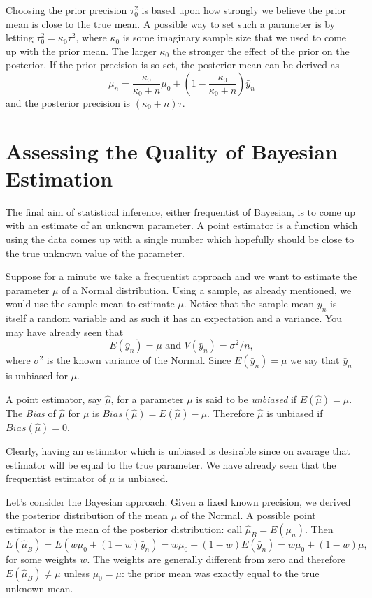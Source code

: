 \documentclass[
]{book}
\begin{document}
Choosing the prior precision \(\tau_0^2\) is based upon how strongly we believe the prior mean is close to the true mean. A possible way to set such a parameter is by letting \(\tau_0^2 = \kappa_0 \tau^2\), where \(\kappa_0\) is some imaginary sample size that we used to come up with the prior mean. The larger \(\kappa_0\) the stronger the effect of the prior on the posterior. If the prior precision is so set, the posterior mean can be derived as
\[
\mu_n= \frac{\kappa_0}{\kappa_0+n}\mu_0+ \left(1-\frac{\kappa_0}{\kappa_0+n}\right)\bar{y}_n
\]
and the posterior precision is \((\kappa_0+n)\tau\).

\hypertarget{assessing-the-quality-of-bayesian-estimation}{%
\section{Assessing the Quality of Bayesian Estimation}\label{assessing-the-quality-of-bayesian-estimation}}

The final aim of statistical inference, either frequentist of Bayesian, is to come up with an estimate of an unknown parameter. A point estimator is a function which using the data comes up with a single number which hopefully should be close to the true unknown value of the parameter.

Suppose for a minute we take a frequentist approach and we want to estimate the parameter \(\mu\) of a Normal distribution. Using a sample, as already mentioned, we would use the sample mean to estimate \(\mu\). Notice that the sample mean \(\bar{y}_n\) is itself a random variable and as such it has an expectation and a variance. You may have already seen that
\[
E(\bar{y}_n)= \mu \mbox{ and } V(\bar{y}_n)= \sigma^2/n,
\]
where \(\sigma^2\) is the known variance of the Normal. Since \(E(\bar{y}_n)=\mu\) we say that \(\bar{y}_n\) is unbiased for \(\mu\).

A point estimator, say \(\hat\mu\), for a parameter \(\mu\) is said to be \emph{unbiased} if \(E(\hat\mu)=\mu\). The \emph{Bias} of \(\hat\mu\) for \(\mu\) is \(Bias(\hat\mu)=E(\hat\mu)-\mu\). Therefore \(\hat\mu\) is unbiased if \(Bias(\hat\mu)=0\).

Clearly, having an estimator which is unbiased is desirable since on avarage that estimator will be equal to the true parameter. We have already seen that the frequentist estimator of \(\mu\) is unbiased.

Let's consider the Bayesian approach. Given a fixed known precision, we derived the posterior distribution of the mean \(\mu\) of the Normal. A possible point estimator is the mean of the posterior distribution: call \(\hat\mu_B = E(\mu_n)\). Then
\[
E(\hat\mu_B)=E(w\mu_0+(1-w)\bar{y}_n)=w\mu_0+(1-w)E(\bar{y}_n)=w\mu_0+(1-w)\mu,
\]
for some weights \(w\). The weights are generally different from zero and therefore \(E(\hat\mu_B)\neq \mu\) unless \(\mu_0=\mu\): the prior mean was exactly equal to the true unknown mean.
\end{document}

